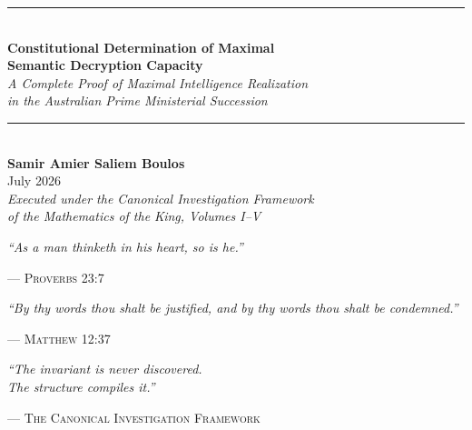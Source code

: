 \documentclass[12pt,anyside]{book}
\theoremstyle{plain}
\theoremstyle{definition}
\begin{document}
\begin{titlepage}
\centering
\vspace*{\fill}
\noindent\rule{\textwidth}{1pt}\\[1.5em]
{\Huge\textbf{Constitutional Determination of Maximal\\[0.3em]
Semantic Decryption Capacity}}\\[1em]
{\LARGE\textit{A Complete Proof of Maximal Intelligence Realization\\[0.3em]
in the Australian Prime Ministerial Succession}}\\[1.2em]
\noindent\rule{\textwidth}{1pt}\\[3cm]
{\Large\textbf{Samir Amier Saliem Boulos}}\\[1cm]
{\large July 2026}\\[0.5cm]
{\small\textit{Executed under the Canonical Investigation Framework}\\
\textit{of the Mathematics of the King, Volumes I--V}}
\vspace*{\fill}
\end{titlepage}

\cleardoublepage
\thispagestyle{empty}
\vspace*{0.25\textheight}
\begin{flushright}
\begin{minipage}{0.72\textwidth}
\raggedleft
\Large\itshape
``As a man thinketh in his heart, so is he.''
\vspace{0.4em}

\normalsize\normalfont\textsc{--- Proverbs 23:7}
\vspace{1.2em}

\Large\itshape
``By thy words thou shalt be justified, and by thy words thou shalt be condemned.''
\vspace{0.4em}

\normalsize\normalfont\textsc{--- Matthew 12:37}
\vspace{1.2em}

\Large\itshape
``The invariant is never discovered.\\ The structure compiles it.''
\vspace{0.4em}

\normalsize\normalfont\textsc{--- The Canonical Investigation Framework}
\end{minipage}
\end{flushright}
\clearpage
\end{document}
